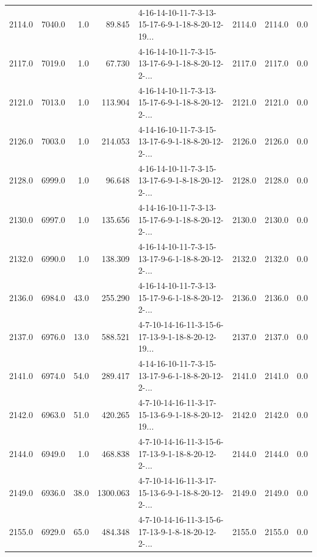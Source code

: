 \begin{tabular}{rrrrlrrr}
 2114.0 &  7040.0 &            1.0 &             89.845 &  4-16-14-10-11-7-3-13-15-17-6-9-1-18-8-20-12-19... &        2114.0 &          2114.0 &       0.0 \\
 2117.0 &  7019.0 &            1.0 &             67.730 &  4-16-14-10-11-7-3-15-13-17-6-9-1-18-8-20-12-2-... &        2117.0 &          2117.0 &       0.0 \\
 2121.0 &  7013.0 &            1.0 &            113.904 &  4-16-14-10-11-7-3-13-15-17-6-9-1-18-8-20-12-2-... &        2121.0 &          2121.0 &       0.0 \\
 2126.0 &  7003.0 &            1.0 &            214.053 &  4-14-16-10-11-7-3-15-13-17-6-9-1-18-8-20-12-2-... &        2126.0 &          2126.0 &       0.0 \\
 2128.0 &  6999.0 &            1.0 &             96.648 &  4-16-14-10-11-7-3-15-13-17-6-9-1-8-18-20-12-2-... &        2128.0 &          2128.0 &       0.0 \\
 2130.0 &  6997.0 &            1.0 &            135.656 &  4-14-16-10-11-7-3-13-15-17-6-9-1-18-8-20-12-2-... &        2130.0 &          2130.0 &       0.0 \\
 2132.0 &  6990.0 &            1.0 &            138.309 &  4-16-14-10-11-7-3-15-13-17-9-6-1-18-8-20-12-2-... &        2132.0 &          2132.0 &       0.0 \\
 2136.0 &  6984.0 &           43.0 &            255.290 &  4-16-14-10-11-7-3-13-15-17-9-6-1-18-8-20-12-2-... &        2136.0 &          2136.0 &       0.0 \\
 2137.0 &  6976.0 &           13.0 &            588.521 &  4-7-10-14-16-11-3-15-6-17-13-9-1-18-8-20-12-19... &        2137.0 &          2137.0 &       0.0 \\
 2141.0 &  6974.0 &           54.0 &            289.417 &  4-14-16-10-11-7-3-15-13-17-9-6-1-18-8-20-12-2-... &        2141.0 &          2141.0 &       0.0 \\
 2142.0 &  6963.0 &           51.0 &            420.265 &  4-7-10-14-16-11-3-17-15-13-6-9-1-18-8-20-12-19... &        2142.0 &          2142.0 &       0.0 \\
 2144.0 &  6949.0 &            1.0 &            468.838 &  4-7-10-14-16-11-3-15-6-17-13-9-1-18-8-20-12-2-... &        2144.0 &          2144.0 &       0.0 \\
 2149.0 &  6936.0 &           38.0 &           1300.063 &  4-7-10-14-16-11-3-17-15-13-6-9-1-18-8-20-12-2-... &        2149.0 &          2149.0 &       0.0 \\
 2155.0 &  6929.0 &           65.0 &            484.348 &  4-7-10-14-16-11-3-15-6-17-13-9-1-8-18-20-12-2-... &        2155.0 &          2155.0 &       0.0 \\

\end{tabular}
